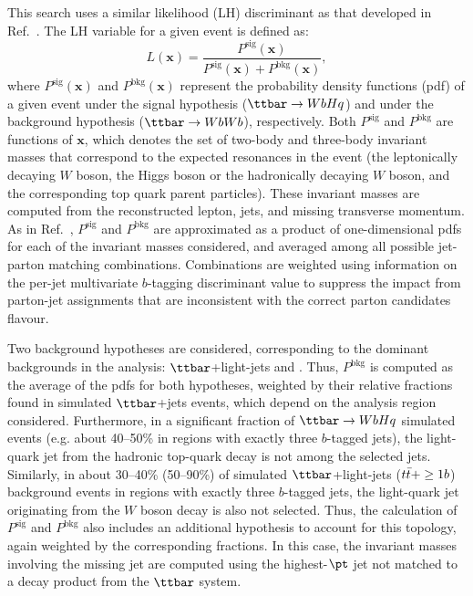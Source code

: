 This search uses a similar likelihood (LH) discriminant as that developed in Ref.~\cite{Aad:2015pja}.
The LH variable for a given event is defined as:
\begin{equation}
L(\mathbf{x}) = \frac{P^\textrm{sig}(\mathbf{x}) }{P^\textrm{sig}(\mathbf{x}) +P^\textrm{bkg}(\mathbf{x}) },
\label{eq:D}
\end{equation}
where $P^\textrm{sig}(\mathbf{x}) $ and $P^\textrm{bkg}(\mathbf{x}) $ represent the probability density functions (pdf) of a given event under
the signal hypothesis ($\ttbar \to WbHq$) and under the background hypothesis ($\ttbar \to WbWb$), respectively.
Both $P^\textrm{sig}$ and $P^\textrm{bkg}$ are functions of $\mathbf{x}$, which denotes the set of two-body and three-body invariant masses 
that correspond to the expected resonances in the event (the leptonically decaying $W$ boson, the Higgs boson or the hadronically 
decaying $W$ boson, and the corresponding top quark parent particles). These invariant masses are computed from the reconstructed 
lepton, jets, and missing transverse momentum.
As in Ref.~\cite{Aad:2015pja}, $P^\textrm{sig}$ and $P^\textrm{bkg}$ are approximated as a product of one-dimensional pdfs for
each of the invariant masses considered, and averaged among all possible jet-parton matching combinations. 
Combinations are weighted using information on the per-jet multivariate $b$-tagging discriminant value to suppress the impact from 
parton-jet assignments that are inconsistent with the correct parton candidates flavour.

Two background hypotheses are considered, corresponding to the dominant backgrounds in
the analysis: $\ttbar$+light-jets and \ttbin. Thus, $P^\textrm{bkg}$ is computed as the average of
the pdfs for both hypotheses, weighted by their relative fractions found in simulated $\ttbar$+jets events, which depend
on the analysis region considered. Furthermore, in a significant fraction of $\Hq$ simulated events (e.g. about 40--50\% in regions with exactly three $b$-tagged jets), 
the light-quark jet from the hadronic top-quark decay is not among the selected jets.
Similarly, in about 30--40\% (50--90\%) of simulated $\ttbar$+light-jets ($t\bar{t}+\geq1b$) background events in regions with exactly three $b$-tagged jets, 
the light-quark jet originating from the $W$ boson decay is also not selected. Thus, the calculation of $P^\textrm{sig}$ and
$P^\textrm{bkg}$ also includes an additional hypothesis to account for this topology, again weighted by the corresponding fractions. 
In this case, the invariant masses involving the missing jet are computed using the highest-$\pt$ jet not matched 
to a decay product from the $\ttbar$ system.


